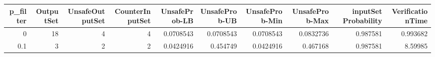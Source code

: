 \begin{tabular}{rrrrrrrrrr}
\hline
   p\_filter &   OutputSet &   UnsafeOutputSet &   CounterInputSet &   UnsafeProb-LB &   UnsafeProb-UB &   UnsafeProb-Min &   UnsafeProb-Max &   inputSet Probability &   VerificationTime \\
\hline
        0   &          18 &                 4 &                 4 &       0.0708543 &       0.0708543 &        0.0708543 &        0.0832736 &               0.987581 &           0.993682 \\
        0.1 &           3 &                 2 &                 2 &       0.0424916 &       0.454749  &        0.0424916 &        0.467168  &               0.987581 &           8.59985  \\
\hline
\end{tabular}
